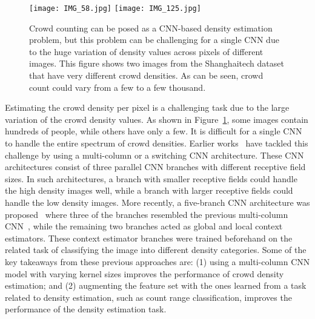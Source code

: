 \documentclass[runningheads]{llncs}
\begin{document}
\begin{figure}[t]
\centering
\texttt{[image: IMG\_58.jpg]}
\texttt{[image: IMG\_125.jpg]}
	\caption{Crowd counting can be posed as a CNN-based density estimation problem, but this problem can be challenging for a single CNN due to the huge variation of density values across pixels of different images. This figure shows two images from the Shanghaitech dataset that have very different crowd densities. As can be seen, crowd count could vary from a few to a few thousand. \label{fig:difdensity}}	
\end{figure}
\iffalse  
\begin{figure}[t]
\centering
\begin{subfigure}
{\texttt{[image: IMG\_58.jpg]}}
{\texttt{[image: IMG\_125.jpg]}}
\end{subfigure}
	\caption{Crowd counting can be posed as a density estimation problem, and this problem is difficult due to the huge variation of density values across pixels of different images. This figure shows two images that have very different crowd density values (per pixel), and it is difficult for a single column CNN to handle a wide spectrum of density values. \label{fig:results}}	
\end{figure}
\fi

Estimating the crowd density per pixel is a challenging task due to the large variation of the crowd density values. As shown in Figure~\ref{fig:difdensity}, some images contain hundreds of people, while others have only a few. It is difficult for a single CNN to handle the entire spectrum of crowd densities. Earlier works~\cite{zhang2016single,sam2017switching} have tackled this challenge by using a multi-column or a switching CNN architecture. These CNN architectures consist of three parallel CNN branches with different receptive field sizes. In such  architectures, a branch with smaller receptive fields could handle the high density images well, while a branch with larger receptive fields could handle the low density images. More recently, a five-branch CNN architecture was proposed~\cite{sindagi2017generating} where three of the branches resembled the previous multi-column CNN~\cite{zhang2016single}, while the remaining two branches acted as global and local context estimators. These context estimator branches were trained beforehand on the related task of classifying the image into different density categories. Some of the key takeaways from these previous approaches are: (1) using a multi-column CNN model with varying kernel sizes improves the performance of crowd density estimation; and (2) augmenting the feature set with the ones learned from a task related to density estimation, such as count range classification, improves the performance of the density estimation task.
\end{document}
